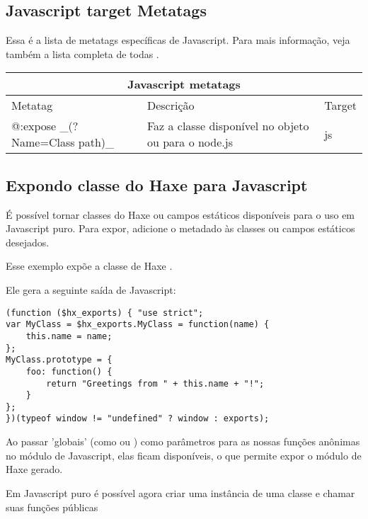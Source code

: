 \subsection{Javascript target Metatags}
\label{target-javascript-metatags}

Essa é a lista de metatags específicas de Javascript. Para mais informação, veja também a lista completa de todas .

\begin{center}
\begin{tabular}{| l | l | l |}
	\hline
	\multicolumn{3}{|c|}{Javascript metatags} \\ \hline
	Metatag &  Descrição & Target \\ \hline
	@:expose \_(?Name=Class path)\_  &  Faz a classe disponível no objeto \expr{window} ou \expr{exports} para o node.js  & js  \\
\end{tabular}
\end{center}

\subsection{Expondo classe do  Haxe para Javascript}
\label{target-javascript-expose}

É possível tornar classes do Haxe ou campos estáticos disponíveis para o uso em Javascript
puro.
Para expor, adicione o metadado  às classes ou campos estáticos desejados.

Esse exemplo expõe a classe de Haxe .


Ele gera a seguinte saída de Javascript:

\begin{lstlisting}
(function ($hx_exports) { "use strict";
var MyClass = $hx_exports.MyClass = function(name) {
	this.name = name;
};
MyClass.prototype = {
	foo: function() {
		return "Greetings from " + this.name + "!";
	}
};
})(typeof window != "undefined" ? window : exports);
\end{lstlisting}

Ao passar 'globais' (como  ou ) como parâmetros para as nossas funções anônimas no módulo de Javascript, elas ficam disponíveis, o que permite expor o módulo de Haxe gerado.

Em Javascript puro é possível agora criar uma instância de uma classe e chamar suas funções públicas

